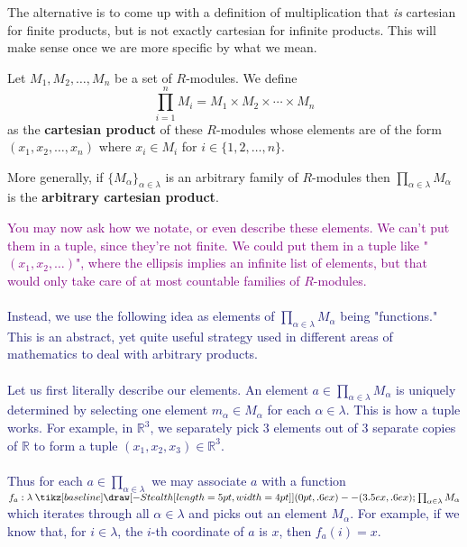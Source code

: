 \documentclass[12pt,letterpaper]{algebra_book}
\renewcommand{\to}{\mathbin{\tikz[baseline] \draw[-{Stealth[length=5pt,width=4pt]}] (0pt,.6ex) -- (3.5ex,.6ex);}}
\newcommand{\RR}{\mathbb{R}}
\theoremstyle{definition}
\begin{document}
The alternative is to come up with a definition of multiplication
that \textit{is} cartesian for finite products, but is not exactly
cartesian for infinite products. This will make sense once we are
more specific by what we mean.

\begin{definition}
    Let $M_1, M_2, \dots, M_n$ be a set of $R$-modules. We define
    \[
        \prod_{i = 1}^{n}M_i =  M_1\times M_2 \times \cdots \times M_n 
    \]
    as the \textbf{cartesian product} of these $R$-modules whose
    elements are of the form $(x_1, x_2, \dots, x_n)$ where $x_i
    \in M_i$ for $i \in \{1, 2, \dots, n\}$. 
    
    More generally, if
    $\{M_\alpha\}_{\alpha \in \lambda}$ is an arbitrary family of
    $R$-modules then $\displaystyle \prod_{\alpha \in \lambda}
    M_\alpha$ is the \textbf{arbitrary cartesian product}. 

    \textcolor{purple}{You may now ask how we notate, or even
    describe these elements. We can't put them in a tuple, since
    they're not finite. We could put them in a tuple like "$(x_1,
    x_2, \dots)$", where the ellipsis implies an infinite list of
    elements, but that would only take care of at most countable
    families of $R$-modules.
    }
    \textcolor{MidnightBlue}{
    \\
    \\
    \indent Instead, we use the following idea as elements of
    $\displaystyle \prod_{\alpha \in \lambda} M_\alpha$ being
    "functions." This is an abstract, yet quite useful strategy
    used in different areas of mathematics to deal with arbitrary
    products. 
    \\
    \\
    \indent Let us first literally describe our elements. An
    element $\displaystyle a \in \prod_{\alpha \in \lambda}
    M_\alpha$ is uniquely determined by selecting one element
    $m_\alpha \in M_\alpha$ for each $\alpha \in \lambda$. This is
    how a tuple works. For example, in $\mathbb{R}^3$, we
    separately pick 3 elements out of 3 separate copies of $\RR$ to
    form a tuple $(x_1, x_2, x_3) \in \mathbb{R}^3$.
    \\
    \\
    Thus for each $\displaystyle a \in \prod_{\alpha \in \lambda}$ we may
    associate $a$ with a function $f_a: \lambda \to \prod_{\alpha
    \in \lambda}M_\alpha$ which iterates through all $\alpha \in \lambda$ and
    picks out an element $M_\alpha$. For example, if we know that,
    for
    $i \in \lambda$, the $i$-th coordinate of $a$ is $x$, then $f_a(i) =
    x$. 
    }
    \begin{center}
\end{center}
\end{definition}
\end{document}
